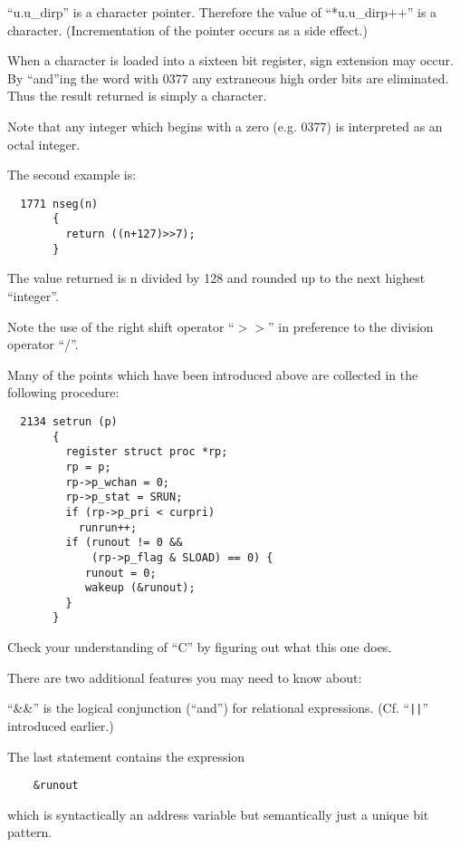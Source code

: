 ``u.u\_dirp'' is a character pointer.
Therefore the value of ``*u.u\_dirp++'' is
a character. (Incrementation of the
pointer occurs as a side effect.)

When a character is loaded into a sixteen bit register, sign extension may
occur. By ``and''ing the word with 0377
any extraneous high order bits are
eliminated. Thus the result returned
is simply a character.

Note that any integer which begins with
a zero (e.g. 0377) is interpreted as an
octal integer.

The second example is:

\begin{verbatim}
  1771 nseg(n)
       {
         return ((n+127)>>7);
       }
\end{verbatim}

The value returned is n divided by 128
and rounded up to the next highest
``integer''.



Note the use of the right shift operator ``$>>$'' in preference to the division
operator ``/''.


Many of the points which have been
introduced above are collected in the
following procedure:

\begin{verbatim}
  2134 setrun (p)
       {
         register struct proc *rp;
         rp = p;
         rp->p_wchan = 0;
         rp->p_stat = SRUN;
         if (rp->p_pri < curpri)
           runrun++;
         if (runout != 0 &&
             (rp->p_flag & SLOAD) == 0) {
            runout = 0;
            wakeup (&runout);
         }
       }
\end{verbatim}


\noindent Check your understanding of ``C'' by
figuring out what this one does.

There are two additional features you
may need to know about:

``\&\&'' is the logical conjunction (``and'')
for relational expressions. (Cf. ``\verb+||+''
introduced earlier.)


The last statement contains the expression

\begin{verbatim}
    &runout
\end{verbatim}

which is syntactically an address variable but semantically just a unique bit
pattern.

